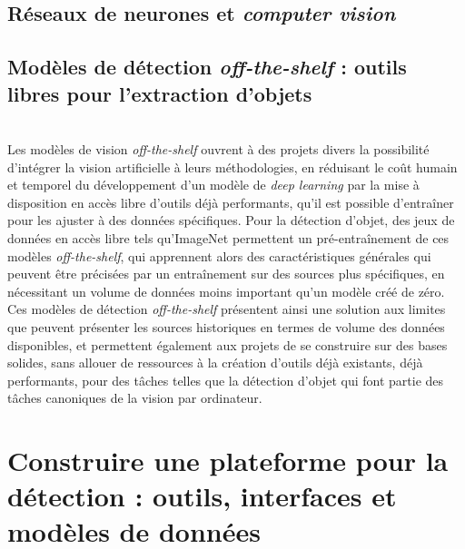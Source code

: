 \documentclass[a4paper,12pt,twoside]{book}
\newcommand{\clearemptydoublepage}{\newpage{\pagestyle{empty}\cleardoublepage}}
\begin{document}
                \section{\label{neuralNets}Réseaux de neurones et \textit{computer vision}}
                    
            
                \section[Modèles de vision \textit{off-the-shelf}]{Modèles de détection \textit{off-the-shelf} : outils libres pour l'extraction d’objets}
                    
        \\
		
		Les modèles de vision \textit{off-the-shelf} ouvrent à des projets divers la possibilité d'intégrer la vision artificielle à leurs méthodologies, en réduisant le coût humain et temporel du développement d'un modèle de \textit{deep learning} par la mise à disposition en accès libre d'outils déjà performants, qu'il est possible d'entraîner pour les ajuster à des données spécifiques. Pour la détection d'objet, des jeux de données en accès libre tels qu'ImageNet permettent un pré-entraînement de ces modèles \textit{off-the-shelf}, qui apprennent alors des caractéristiques générales qui peuvent être précisées par un entraînement sur des sources plus spécifiques, en nécessitant un volume de données moins important qu'un modèle créé de zéro. Ces modèles de détection \textit{off-the-shelf} présentent ainsi une solution aux limites que peuvent présenter les sources historiques en termes de volume des données disponibles, et permettent également aux projets de se construire sur des bases solides, sans allouer de ressources à la création d'outils déjà existants, déjà performants, pour des tâches telles que la détection d'objet qui font partie des tâches canoniques de la vision par ordinateur.
        \clearemptydoublepage
        
        \chapter[Construire une plateforme pour la détection]{Construire une plateforme pour la détection : outils, interfaces et modèles de données}
        
\end{document}
